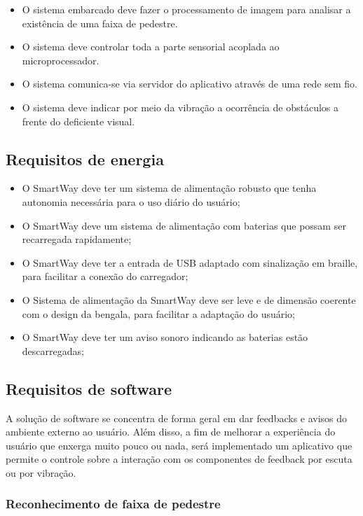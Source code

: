 \begin{itemize}
\item O sistema embarcado deve fazer o processamento de imagem para analisar a existência de uma faixa de pedestre.
\item O sistema deve controlar toda a parte sensorial acoplada ao microprocessador.
\item O sistema comunica-se via servidor do aplicativo através de uma rede sem fio.
\item O sistema deve indicar por meio da vibração a ocorrência de obstáculos a frente do deficiente visual.
\end{itemize}

\subsection{Requisitos de energia}
\begin{itemize}
\item O SmartWay deve ter um sistema de alimentação robusto que tenha autonomia necessária para o uso diário do usuário; 
\item O SmartWay deve um sistema de alimentação com baterias que possam ser recarregada rapidamente;
\item O SmartWay deve ter a entrada de USB adaptado com sinalização em braille, para facilitar a conexão do carregador;
\item O Sistema de alimentação da SmartWay deve ser leve e de dimensão coerente com o design da bengala, para facilitar a adaptação do usuário; 
\item O SmartWay deve ter um aviso sonoro indicando as baterias estão descarregadas;

\end{itemize}

\subsection{Requisitos de software}

A solução de software se concentra de forma geral em dar feedbacks e avisos do ambiente externo ao usuário. Além disso, a fim de melhorar a experiência do usuário que enxerga muito pouco ou nada, será implementado um aplicativo que permite o controle sobre a interação com os componentes de feedback por escuta ou por vibração.

\subsubsection{Reconhecimento de faixa de pedestre}

